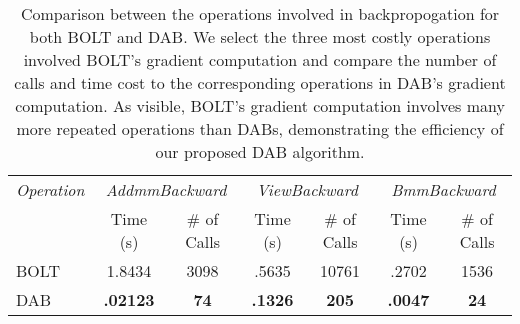 \begin{table}
\caption{Comparison between the operations involved in backpropogation for both BOLT and DAB. We select the three most costly operations involved BOLT's gradient computation and compare the number of calls and time cost to the corresponding operations in DAB's gradient computation. As visible, BOLT's gradient computation involves many more repeated operations than DABs, demonstrating the efficiency of our proposed DAB algorithm.}
\label{table:common_grad_computations}
\centering
\begin{tabular}{l |c c | c c | c c}\toprule
\textit{Operation} & \multicolumn{2}{c|}{\textit{AddmmBackward}} & \multicolumn{2}{c|}{\textit{ViewBackward}} & \multicolumn{2}{c}{\textit{BmmBackward}} \\ 
                    & Time (s) & \# of Calls & Time (s) & \# of Calls & Time (s) & \# of Calls \\ \midrule
BOLT & 1.8434 & 3098 & .5635 & 10761 & .2702 & 1536 \\ 
DAB & \textbf{.02123} & \textbf{74} & \textbf{.1326} & \textbf{205} & \textbf{.0047} & \textbf{24} 
\\\bottomrule
\end{tabular}
\end{table}
